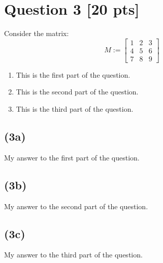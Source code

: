 \section*{Question 3 [20 pts]}

Consider the matrix:
$$M := \begin{bmatrix}
1 & 2 & 3 \\
4 & 5 & 6 \\
7 & 8 & 9
\end{bmatrix}$$

\begin{enumerate}[label=(\alph*)]
\item This is the first part of the question.
\item This is the second part of the question.
\item This is the third part of the question.
\end{enumerate}

\solidrule

\subsection*{(3a)}

My answer to the first part of the question.

\dotrule

\subsection*{(3b)}

My answer to the second part of the question.

\dotrule

\subsection*{(3c)}

My answer to the third part of the question.


\solidrule